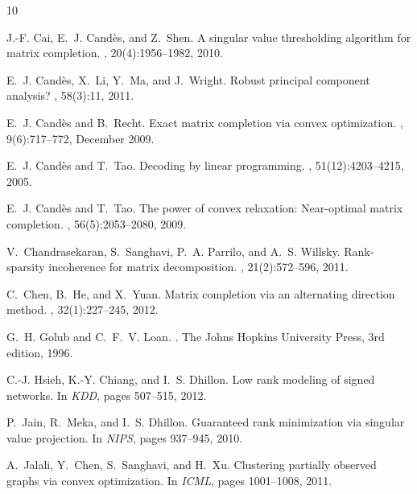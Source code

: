 \documentclass[11pt]{article}
\theoremstyle{plain}
\theoremstyle{definition}
\begin{document}
%
% 
\begin{thebibliography}{10}

J.-F. Cai, E.~J. Cand\`{e}s, and Z.~Shen.
\newblock A singular value thresholding algorithm for matrix completion.
, 20(4):1956--1982, 2010.

E.~J. Cand{\`e}s, X.~Li, Y.~Ma, and J.~Wright.
\newblock Robust principal component analysis?
, 58(3):11, 2011.

E.~J. Cand{\`e}s and B.~Recht.
\newblock Exact matrix completion via convex optimization.
, 9(6):717--772,
  December 2009.

E.~J. Cand{\`e}s and T.~Tao.
\newblock Decoding by linear programming.
, 51(12):4203--4215,
  2005.

E.~J. Cand{\`e}s and T.~Tao.
\newblock The power of convex relaxation: Near-optimal matrix completion.
, 56(5):2053--2080, 2009.

V.~Chandrasekaran, S.~Sanghavi, P.~A. Parrilo, and A.~S. Willsky.
\newblock Rank-sparsity incoherence for matrix decomposition.
, 21(2):572--596, 2011.

C.~Chen, B.~He, and X.~Yuan.
\newblock Matrix completion via an alternating direction method.
, 32(1):227--245, 2012.

G.~H. Golub and C.~F.~V. Loan.
.
\newblock The Johns Hopkins University Press, 3rd edition, 1996.

C.-J. Hsieh, K.-Y. Chiang, and I.~S. Dhillon.
\newblock Low rank modeling of signed networks.
\newblock In {\em KDD}, pages 507--515, 2012.

P.~Jain, R.~Meka, and I.~S. Dhillon.
\newblock Guaranteed rank minimization via singular value projection.
\newblock In {\em NIPS}, pages 937--945, 2010.

A.~Jalali, Y.~Chen, S.~Sanghavi, and H.~Xu.
\newblock Clustering partially observed graphs via convex optimization.
\newblock In {\em ICML}, pages 1001--1008, 2011.


\end{thebibliography}
\end{document}
